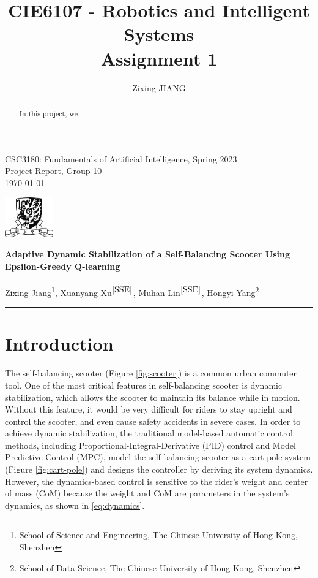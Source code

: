 \documentclass[10pt,a4paper]{article}
\title{\textbf{CIE6107 - Robotics and Intelligent Systems \\Assignment 1}}
\author{Zixing JIANG}
\begin{document}
	
\begin{flushleft}
	CSC3180: Fundamentals of Artificial Intelligence, Spring 2023\\
	Project Report, Group 10\\
	\today
\end{flushleft}
	
\begin{flushright}\vspace{-18mm}
	\includegraphics[height=1.7cm]{figure/logo.png}
\end{flushright}
	
\begin{center}\vspace{0.5cm}
	\textbf{\Large Adaptive Dynamic Stabilization of a Self-Balancing Scooter Using Epsilon-Greedy Q-learning}\\~\\
	\large Zixing Jiang\footnote{School of Science and Engineering, The Chinese University of Hong Kong, Shenzhen\label{SSE}}, Xuanyang Xu$^{\ref{SSE}}$, Muhan Lin$^{\ref{SSE}}$, Hongyi Yang\footnote{School of Data Science, The Chinese University of Hong Kong, Shenzhen}
\end{center}
{\noindent}\rule{\linewidth}{0.1mm}

\begin{abstract}
	In this project, we 
\end{abstract} 

\section{Introduction}
The self-balancing scooter (Figure \ref{fig:scooter}) is a common urban commuter tool. One of the most critical features in self-balancing scooter is dynamic stabilization,  which allows the scooter to maintain its balance while in motion. Without this feature, it would be very difficult for riders to stay upright and control the scooter, and even cause safety accidents in severe cases. In order to achieve dynamic stabilization, the traditional model-based automatic control methods, including Proportional-Integral-Derivative (PID) control and Model Predictive Control (MPC), model the self-balancing scooter as a cart-pole system (Figure \ref{fig:cart-pole}) and designs the controller by deriving its system dynamics. However, the dynamics-based control is sensitive to the rider's weight and center of mass (CoM) because the weight and CoM are parameters in the system's dynamics, as shown in \eqref{eq:dynamics}.
\end{document}
